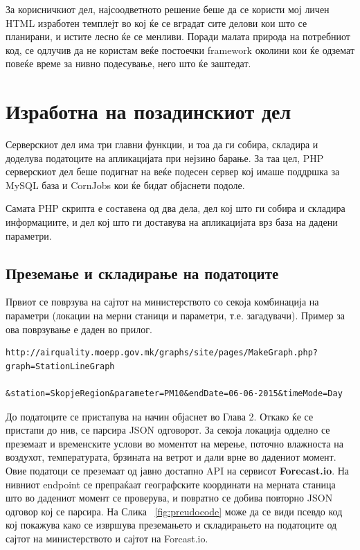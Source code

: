 \documentclass{uvamscse}
\begin{document}
\vspace{5mm}

За корисничкиот дел, најсоодветното решение беше да се користи мој личен HTML изработен темплејт во кој ќе се вградат сите делови кои што се планирани, и истите лесно ќе се менливи. Поради малата природа на потребниот код, се одлучив да не користам веќе постоечки framework околини кои ќе одземат повеќе време за нивно подесување, него што ќе заштедат.
\section{Изработна на позадинскиот дел}
Серверскиот дел има три главни функции, и тоа да ги собира, складира и доделува податоците на апликацијата при нејзино барање. За таа цел, PHP серверскиот дел беше подигнат на веќе подесен сервер кој имаше поддршка за MySQL база и CornJobs кои ќе бидат објаснети подоле.
\vspace{5mm}

Самата PHP скрипта е составена од два дела, дел кој што ги собира и складира информациите, и дел кој што ги доставува на апликацијата врз база на дадени параметри. 

\subsection{Преземање и складирање на податоците}
Првиот се поврзува на сајтот на министерството со секоја комбинација на параметри (локации на мерни станици и параметри, т.е. загадувачи). Пример за ова поврзување е даден во прилог.

\vspace{5mm}

\begin{snippet}
\begin{verbatim}
http://airquality.moepp.gov.mk/graphs/site/pages/MakeGraph.php?graph=StationLineGraph
                                &station=SkopjeRegion&parameter=PM10&endDate=06-06-2015&timeMode=Day
\end{verbatim}
\end{snippet}
\vspace{5mm}

До податоците се пристапува на начин објаснет во Глава 2. Откако ќе се пристапи до нив, се парсира JSON одговорот. За секоја локација одделно се преземаат и временските услови во моментот на мерење, поточно влажноста на воздухот, температурата, брзината на ветрот и дали врне во дадениот момент. Овие податоци се преземаат од јавно достапно API на сервисот \textbf{Forecast.io}. На нивниот endpoint се препраќаат географските координати на мерната станица што во дадениот момент се проверува, и повратно се добива повторно JSON одговор кој се парсира. На Слика ~\ref{fig:preudocode} може да се види псевдо код кој покажува како се извршува преземањето и складирањето на податоците од сајтот на министерството и сајтот на Forcast.io.
\end{document}

